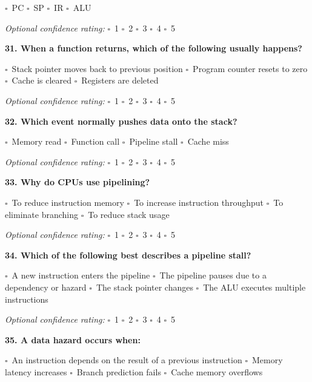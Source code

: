 \documentclass[12pt,a4paper]{article}
\newcommand{\boxmark}{\(\square\)}
\newcommand{\confidenceoptional}{%
    \textit{Optional confidence rating:} \boxmark\ 1 \hspace{1em} \boxmark\ 2 \hspace{1em} \boxmark\ 3 \hspace{1em} \boxmark\ 4 \hspace{1em} \boxmark\ 5
}
\begin{document}
\boxmark\ PC \hspace{2em}
\boxmark\ SP \hspace{2em}
\boxmark\ IR \hspace{2em}
\boxmark\ ALU

\confidenceoptional

\textbf{31. When a function returns, which of the following usually happens?}

\boxmark\ Stack pointer moves back to previous position \hspace{1em}
\boxmark\ Program counter resets to zero \hspace{1em}
\boxmark\ Cache is cleared \hspace{1em}
\boxmark\ Registers are deleted

\confidenceoptional

\textbf{32. Which event normally pushes data onto the stack?}

\boxmark\ Memory read \hspace{2em}
\boxmark\ Function call \hspace{2em}
\boxmark\ Pipeline stall \hspace{2em}
\boxmark\ Cache miss

\confidenceoptional

\textbf{33. Why do CPUs use pipelining?}

\boxmark\ To reduce instruction memory \hspace{1em}
\boxmark\ To increase instruction throughput \hspace{1em}
\boxmark\ To eliminate branching \hspace{1em}
\boxmark\ To reduce stack usage

\confidenceoptional

\textbf{34. Which of the following best describes a pipeline stall?}

\boxmark\ A new instruction enters the pipeline \hspace{1em}
\boxmark\ The pipeline pauses due to a dependency or hazard \hspace{1em}
\boxmark\ The stack pointer changes \hspace{1em}
\boxmark\ The ALU executes multiple instructions

\confidenceoptional

\textbf{35. A data hazard occurs when:}

\boxmark\ An instruction depends on the result of a previous instruction \hspace{1em}
\boxmark\ Memory latency increases \hspace{1em}
\boxmark\ Branch prediction fails \hspace{1em}
\boxmark\ Cache memory overflows
\end{document}
